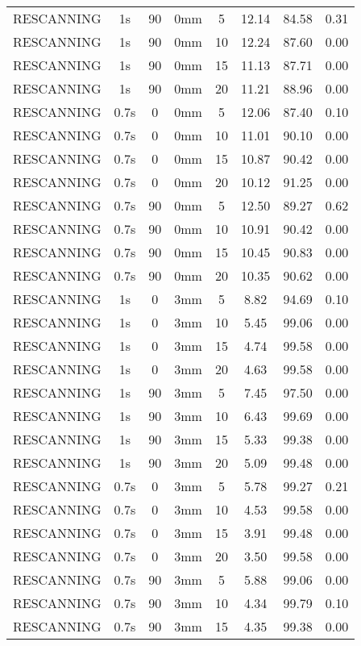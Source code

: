 \begin{table}[H]
\begin{tabular}{|c||c|c|c|c||c|c|c|}
RESCANNING & 1s & 90 & 0mm & 5 & 12.14 & 84.58 & 0.31 \\
RESCANNING & 1s & 90 & 0mm & 10 & 12.24 & 87.60 & 0.00 \\
RESCANNING & 1s & 90 & 0mm & 15 & 11.13 & 87.71 & 0.00 \\
RESCANNING & 1s & 90 & 0mm & 20 & 11.21 & 88.96 & 0.00 \\
RESCANNING & 0.7s & 0 & 0mm & 5 & 12.06 & 87.40 & 0.10 \\
RESCANNING & 0.7s & 0 & 0mm & 10 & 11.01 & 90.10 & 0.00 \\
RESCANNING & 0.7s & 0 & 0mm & 15 & 10.87 & 90.42 & 0.00 \\
RESCANNING & 0.7s & 0 & 0mm & 20 & 10.12 & 91.25 & 0.00 \\
RESCANNING & 0.7s & 90 & 0mm & 5 & 12.50 & 89.27 & 0.62 \\
RESCANNING & 0.7s & 90 & 0mm & 10 & 10.91 & 90.42 & 0.00 \\
RESCANNING & 0.7s & 90 & 0mm & 15 & 10.45 & 90.83 & 0.00 \\
RESCANNING & 0.7s & 90 & 0mm & 20 & 10.35 & 90.62 & 0.00 \\
RESCANNING & 1s & 0 & 3mm & 5 & 8.82 & 94.69 & 0.10 \\
RESCANNING & 1s & 0 & 3mm & 10 & 5.45 & 99.06 & 0.00 \\
RESCANNING & 1s & 0 & 3mm & 15 & 4.74 & 99.58 & 0.00 \\
RESCANNING & 1s & 0 & 3mm & 20 & 4.63 & 99.58 & 0.00 \\
RESCANNING & 1s & 90 & 3mm & 5 & 7.45 & 97.50 & 0.00 \\
RESCANNING & 1s & 90 & 3mm & 10 & 6.43 & 99.69 & 0.00 \\
RESCANNING & 1s & 90 & 3mm & 15 & 5.33 & 99.38 & 0.00 \\
RESCANNING & 1s & 90 & 3mm & 20 & 5.09 & 99.48 & 0.00 \\
RESCANNING & 0.7s & 0 & 3mm & 5 & 5.78 & 99.27 & 0.21 \\
RESCANNING & 0.7s & 0 & 3mm & 10 & 4.53 & 99.58 & 0.00 \\
RESCANNING & 0.7s & 0 & 3mm & 15 & 3.91 & 99.48 & 0.00 \\
RESCANNING & 0.7s & 0 & 3mm & 20 & 3.50 & 99.58 & 0.00 \\
RESCANNING & 0.7s & 90 & 3mm & 5 & 5.88 & 99.06 & 0.00 \\
RESCANNING & 0.7s & 90 & 3mm & 10 & 4.34 & 99.79 & 0.10 \\
RESCANNING & 0.7s & 90 & 3mm & 15 & 4.35 & 99.38 & 0.00 \\

\end{tabular}
\end{table}
